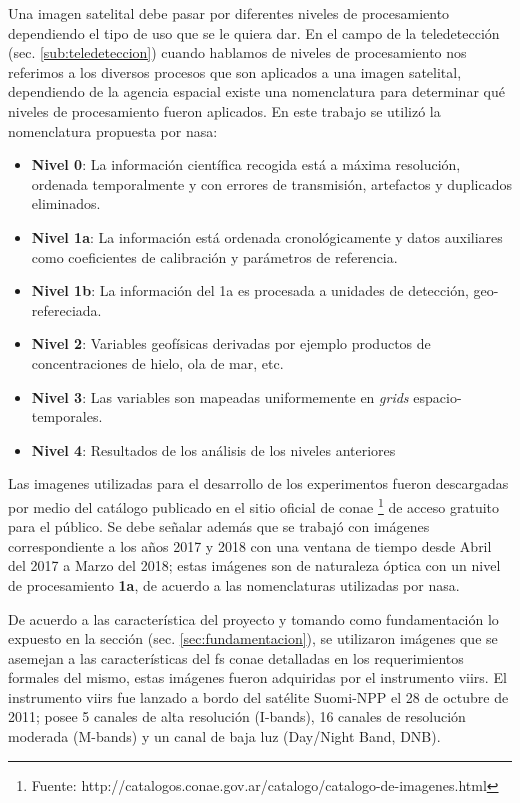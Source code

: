Una imagen satelital debe pasar por diferentes niveles de procesamiento dependiendo el tipo de uso que se le quiera dar. En el campo de la teledetección (sec. \ref{sub:teledeteccion}) cuando hablamos de niveles de procesamiento nos referimos a los diversos procesos que son aplicados a una imagen satelital, dependiendo de la agencia espacial existe una nomenclatura para determinar qué niveles de procesamiento fueron aplicados. En este trabajo se utilizó la nomenclatura propuesta por \ac{nasa}:
\begin{itemize}
	\item \textbf{Nivel 0}: La información científica recogida está a máxima resolución, ordenada temporalmente y con errores de transmisión, artefactos y duplicados eliminados.
 	\item \textbf{Nivel 1a}: La información está ordenada cronológicamente y datos auxiliares como coeficientes de calibración y parámetros de referencia.
 	\item \textbf{Nivel 1b}: La información del 1a es procesada a unidades de detección, geo-refereciada.
 	\item \textbf{Nivel 2}: Variables geofísicas derivadas por ejemplo productos de concentraciones de hielo, ola de mar, etc.
 	\item \textbf{Nivel 3}: Las variables son mapeadas uniformemente en \textit{grids} espacio-temporales.
 	\item \textbf{Nivel 4}: Resultados de los análisis de los niveles anteriores
\end{itemize}

Las imagenes utilizadas para el desarrollo de los experimentos fueron descargadas por medio del catálogo  publicado en el sitio oficial de \ac{conae} \footnote{Fuente: http://catalogos.conae.gov.ar/catalogo/catalogo-de-imagenes.html} de acceso gratuito para el público. Se debe señalar además que se trabajó con imágenes correspondiente a los años 2017 y 2018 con una ventana de tiempo desde Abril del 2017 a Marzo del 2018; estas imágenes son de naturaleza óptica con un nivel de procesamiento \textbf{1a}, de acuerdo a las nomenclaturas utilizadas por \ac{nasa}.

De acuerdo a las característica del proyecto y tomando como fundamentación lo expuesto en la sección (sec. \ref{sec:fundamentacion}), se utilizaron imágenes que se asemejan a las características del \ac{fs} \ac{conae} detalladas en los requerimientos formales del mismo, estas imágenes fueron adquiridas por el instrumento \ac{viirs}. El instrumento \ac{viirs} fue lanzado a bordo del satélite Suomi-NPP el 28 de octubre de 2011; posee 5 canales de alta resolución (I-bands), 16 canales de resolución moderada (M-bands) y un canal de baja luz (Day/Night Band, DNB).  

